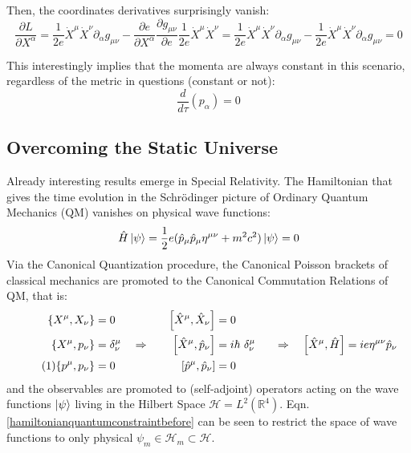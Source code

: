 \documentclass[twoside,a4paper,11pt]{article}
\newcommand\numberthis{\addtocounter{equation}{1}\tag{\theequation}} %
\numberwithin{equation}{section}
\begin{document}
Then, the coordinates derivatives surprisingly vanish:
\begin{equation}
    \frac{\partial L}{\partial X^\alpha } = \frac{1}{2e}\dot{X}^\mu \dot{X}^\nu \partial_\alpha g_{\mu \nu} - \frac{\partial e}{\partial X^\alpha } \frac{\partial g_{\mu \nu}}{\partial e}\frac{1}{2e}\dot{X}^\mu \dot{X}^\nu = \frac{1}{2e}\dot{X}^\mu \dot{X}^\nu \partial_\alpha g_{\mu \nu} - \frac{1}{2e}\dot{X}^\mu \dot{X}^\nu \partial_\alpha g_{\mu \nu} = 0
\end{equation}

This interestingly implies that the momenta are always constant in this scenario, regardless of the metric in questions (constant or not):
\begin{equation}
    \frac{d}{d\tau}(p_\alpha) = 0
    \label{alwaysconstantmomenta}
\end{equation}
\fi


\subsection{Overcoming the Static Universe}
Already interesting results emerge in Special Relativity. The Hamiltonian that gives the time evolution in the Schr{\"o}dinger picture of Ordinary Quantum Mechanics (QM) vanishes on physical wave functions:
\begin{equation}
    \hat{H} \ket{\psi} = \frac{1}{2}e ( \hat{p}_\mu \hat{p}_\mu \eta^{\mu\nu} + m^2 c^2) \ket{\psi} =  0
    \label{hamiltonianquantumconstraintbefore}
\end{equation}
Via the Canonical Quantization procedure, the Canonical Poisson brackets of classical mechanics are promoted to the Canonical Commutation Relations of QM, that is:
\begin{align*}
	\{X^\mu, X_\nu\} & = 0   & \left[\hat{X}^\mu, \hat{X}_\nu\right] &= 0 & \\
    \{X^\mu, p_\nu\} & =  \delta^\mu_\nu \quad  \Rightarrow    \quad  & \left[ \hat{X}^{\mu}, \hat{p}_{\nu} \right]  &= i \hbar \ \delta^\mu_\nu & \quad  \Rightarrow \quad \left[ \hat{X}^\mu, \hat{H} \right] = i e \eta^{\mu\nu} \hat{p}_\nu \\ \numberthis 
     \{p^\mu, p_\nu\} & = 0   & \left[ \hat{p}^\mu, \hat{p}_\nu \right] & = 0 &
\end{align*}
and the observables are promoted to (self-adjoint) operators acting on the wave functions $\ket{\psi}$ living in the Hilbert Space $\mathcal{H}= L^2(\mathbb{R}^4)$. Eqn. \ref{hamiltonianquantumconstraintbefore} can be seen to restrict the space of wave functions to only physical $\psi_m \in  \mathcal{H}_m \subset \mathcal{H}$.
\end{document}
